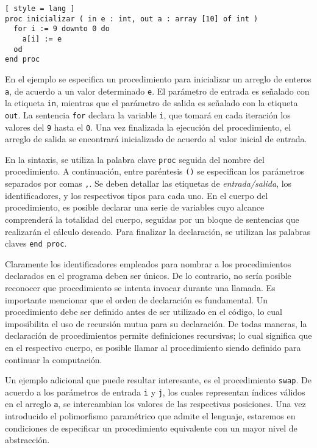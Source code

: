 \begin{lstlisting}[ style = lang ]
proc inicializar ( in e : int, out a : array [10] of int )
  for i := 9 downto 0 do
    a[i] := e
  od
end proc
\end{lstlisting}

En el ejemplo se especifica un procedimiento para inicializar un arreglo de enteros \lstinline[style = lang]{a}, de acuerdo a un valor determinado \lstinline[style = lang]{e}.
El parámetro de entrada es señalado con la etiqueta \lstinline[style = lang]{in}, mientras que el parámetro de salida es señalado con la etiqueta \lstinline[style = lang]{out}.
La sentencia \lstinline[style = lang]{for} declara la variable \lstinline[style = lang]{i}, que tomará en cada iteración los valores del \lstinline[style = lang]{9} hasta el \lstinline[style = lang]{0}.
Una vez finalizada la ejecución del procedimiento, el arreglo de salida se encontrará inicializado de acuerdo al valor inicial de entrada.

En la sintaxis, se utiliza la palabra clave \lstinline[style = lang]{proc} seguida del nombre del procedimiento.
A continuación, entre paréntesis \lstinline[style = lang]{()} se especifican los parámetros separados por comas \lstinline[style = lang]{,}.
Se deben detallar las etiquetas de \textit{entrada/salida}, los identificadores, y los respectivos tipos para cada uno.
En el cuerpo del procedimiento, es posible declarar una serie de variables cuyo alcance comprenderá la totalidad del cuerpo, seguidas por un bloque de sentencias que realizarán el cálculo deseado.
Para finalizar la declaración, se utilizan las palabras claves \lstinline[style = lang]{end proc}.

Claramente los identificadores empleados para nombrar a los procedimientos declarados en el programa deben ser únicos.
De lo contrario, no sería posible reconocer que procedimiento se intenta invocar durante una llamada.
Es importante mencionar que el orden de declaración es fundamental.
Un procedimiento debe ser definido antes de ser utilizado en el código, lo cual imposibilita el uso de recursión mutua para su declaración.
De todas maneras, la declaración de procedimientos permite definiciones recursivas; lo cual significa que en el respectivo cuerpo, es posible llamar al procedimiento siendo definido para continuar la computación.

Un ejemplo adicional que puede resultar interesante, es el procedimiento \lstinline[style = lang]{swap}.
De acuerdo a los parámetros de entrada \lstinline[style = lang]{i} y \lstinline[style = lang]{j}, los cuales representan índices válidos en el arreglo \lstinline[style = lang]{a}, se intercambian los valores de las respectivas posiciones.
Una vez introducido el polimorfismo paramétrico que admite el lenguaje, estaremos en condiciones de especificar un procedimiento equivalente con un mayor nivel de abstracción.

